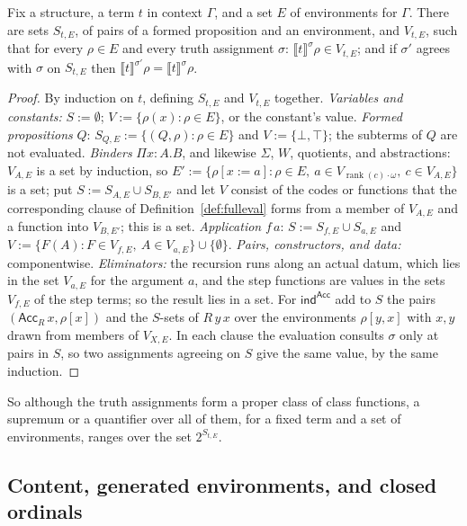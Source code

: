 \documentclass[10pt]{article}
\newcommand{\rk}{\operatorname{rank}}
\newcommand{\sem}[1]{\llbracket #1\rrbracket}
\begin{document}
\begin{lemma}\label{lem:sigmaloc}
Fix a structure, a term $t$ in context $\Gamma$, and a set $E$ of
environments for $\Gamma$. There are sets $S_{t,E}$, of pairs of a
formed proposition and an environment, and $V_{t,E}$, such that for
every $\rho\in E$ and every truth assignment $\sigma$:
$\sem t^\sigma\rho\in V_{t,E}$; and if $\sigma'$ agrees with $\sigma$ on
$S_{t,E}$ then $\sem{t}^{\sigma'}\rho=\sem t^\sigma\rho$.
\end{lemma}
\begin{proof}
By induction on $t$, defining $S_{t,E}$ and $V_{t,E}$ together.
\emph{Variables and constants:} $S:=\emptyset$; $V:=\{\rho(x):\rho\in E\}$,
or the constant's value. \emph{Formed propositions} $Q$:
$S_{Q,E}:=\{(Q,\rho):\rho\in E\}$ and $V:=\{\bot,\top\}$; the subterms of
$Q$ are not evaluated. \emph{Binders} $\Pi x{:}A.B$, and likewise
$\Sigma$, $W$, quotients, and abstractions: $V_{A,E}$ is a set by
induction, so
$E':=\{\rho[x{:=}a]:\rho\in E,\ a\in V_{\rk(c)\cdot\omega},\ c\in V_{A,E}\}$
is a set; put $S:=S_{A,E}\cup S_{B,E'}$ and let $V$ consist of the
codes or functions that the corresponding clause of
Definition~\ref{def:fulleval} forms from a member of $V_{A,E}$ and a
function into $V_{B,E'}$; this is a set. \emph{Application} $f\,a$:
$S:=S_{f,E}\cup S_{a,E}$ and $V:=\{F(A):F\in V_{f,E},\ A\in V_{a,E}\}\cup\{\emptyset\}$.
\emph{Pairs, constructors, and data:} componentwise. \emph{Eliminators:}
the recursion runs along an actual datum, which lies in the set
$V_{a,E}$ for the argument $a$, and the step functions are values in the
sets $V_{f,E}$ of the step terms; so the result lies in a set. For
$\mathsf{ind}^{\mathsf{Acc}}$ add to $S$ the pairs
$(\mathsf{Acc}_R\,x,\rho[x])$ and the $S$-sets of $R\,y\,x$ over the
environments $\rho[y,x]$ with $x,y$ drawn from members of $V_{X,E}$. In
each clause the evaluation consults $\sigma$ only at pairs in $S$, so
two assignments agreeing on $S$ give the same value, by the same
induction.
\end{proof}

So although the truth assignments form a proper class of class
functions, a supremum or a quantifier over all of them, for a fixed
term and a set of environments, ranges over the set $2^{S_{t,E}}$.

\subsection{Content, generated environments, and closed ordinals}\label{sec:closure}
\end{document}
